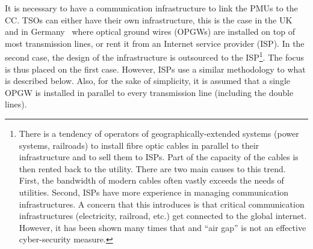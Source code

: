 It is necessary to have a communication infrastructure to link the PMUs to the CC. TSOs can either have their own infrastructure, this is \eg the case in the UK~\cite[p110]{bookUK_OPGW} and in Germany~\cite[p42]{ThesisInspire} where optical ground wires (OPGWs) are installed on top of most transmission lines, or rent it from an Internet service provider (ISP). In the second case, the design of the infrastructure is outsourced to the ISP\footnote{There is a tendency of operators of geographically-extended systems (power systems, railroads) to install fibre optic cables in parallel to their infrastructure and to sell them to ISPs. Part of the capacity of the cables is then rented back to the utility. There are two main causes to this trend. First, the bandwidth of modern cables often vastly exceeds the needs of utilities. Second, ISPs have more experience in managing communication infrastructures. A concern that this introduces is that critical communication infrastructures (electricity, railroad, etc.) get connected to the global internet. However, it has been shown many times that and ``air gap'' is not an effective cyber-security measure.}. The focus is thus placed on the first case. However, ISPs use a similar methodology to what is described below. Also, for the sake of simplicity, it is assumed that a single OPGW is installed in parallel to every transmission line (including the double lines).

